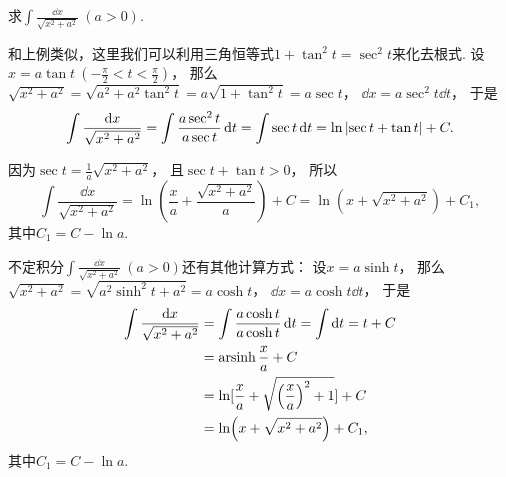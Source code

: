 \begin{example}
求\(\int \frac{\dd{x}}{\sqrt{x^2 + a^2}}\ (a>0)\).
\begin{solution}
和上例类似，这里我们可以利用三角恒等式\(1+\tan^2t=\sec^2t\)来化去根式.
设\(x = a \tan t\ (-\frac{\pi}{2} < t < \frac{\pi}{2})\)，
那么\(\sqrt{x^2 + a^2}
= \sqrt{a^2 + a^2 \tan^2 t}
= a \sqrt{1 + \tan^2 t}
= a \sec t\)，
\(\dd{x} = a \sec^2 t \dd{t}\)，
于是\[
	\int \frac{\dd{x}}{\sqrt{x^2 + a^2}}
	= \int \frac{a \sec^2 t}{a \sec t} \dd{t}
	= \int \sec t \dd{t}
	= \ln\abs{\sec t + \tan t} + C.
\]

因为\(\sec t = \frac{1}{a} \sqrt{x^2 + a^2}\)，
且\(\sec t + \tan t > 0\)，
所以\[
	\int \frac{\dd{x}}{\sqrt{x^2 + a^2}}
	= \ln( \frac{x}{a} + \frac{\sqrt{x^2 + a^2}}{a} ) + C
	= \ln(x + \sqrt{x^2 + a^2}) + C_1,
\]
其中\(C_1 = C - \ln a\).
\end{solution}
\end{example}
\begin{remark}
不定积分\(\int \frac{\dd{x}}{\sqrt{x^2 + a^2}}\ (a>0)\)还有其他计算方式：
设\(x = a \sinh t\)，
那么\(\sqrt{x^2+a^2}
=\sqrt{a^2\sinh^2t+a^2}
=a\cosh t\)，
\(\dd{x}=a\cosh t\dd{t}\)，
于是\begin{align*}
	\int\frac{\dd{x}}{\sqrt{x^2+a^2}}
	&= \int\frac{a\cosh t}{a\cosh t}\dd{t}
	= \int\dd{t}
	= t+C \\
	&= \operatorname{arsinh}\frac{x}{a} + C \\
	&= \ln[\frac{x}{a}+\sqrt{\left(\frac{x}{a}\right)^2+1}] + C \\
	&= \ln(x+\sqrt{x^2+a^2})+C_1,
\end{align*}
其中\(C_1=C-\ln a\).
\end{remark}


